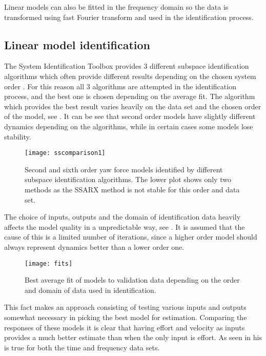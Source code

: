 Linear models can also be fitted in the frequency domain so the data is transformed using fast Fourier transform \cite{van1992computational} and used in the identification process.

\subsection{Linear model identification}
The System Identification Toolbox provides 3 different subspace identification algorithms which often provide different results depending on the chosen system order \cite{van1994n4sid}. 
For this reason all 3 algorithms are attempted in the identification process, and the best one is chosen depending on the average fit.
The algorithm which provides the best result varies heavily on the data set and the chosen order of the model, see .
It can be see that second order models have slightly different dynamics depending on the algorithms, while in certain cases some models lose stability.

\begin{figure}[H]
\centering
\hspace{-2em}\texttt{[image: sscomparison1]}
\caption{Second and sixth order yaw force models identified by different subspace identification algorithms. 
The lower plot shows only two methods as the SSARX method is not stable for this order and data set.}
\label{fig:ssid1}
\end{figure}

The choice of inputs, outputs and the domain of identification data heavily affects the model quality in a unpredictable way, see .
It is assumed that the cause of this is a limited number of iterations, since a higher order model should always represent dynamics better than a lower order one.

\begin{figure}[H]
\hspace{-2.5em}\texttt{[image: fits]}
\caption{Best average fit of models to validation data depending on the order and domain of data used in identification.}
\label{fig:fits}
\end{figure}

This fact makes an approach consisting of testing various inputs and outputs somewhat necessary in picking the best model for estimation.
Comparing the responses of these models it is clear that having effort and velocity as inputs provides a much better estimate than when the only input is effort.
As seen in  his is true for both the time and frequency data sets.

